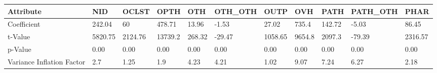 \begin{tabular}{lllllllllll}
\toprule
Attribute &      NID &    OCLST &     OPTH &     OTH & OTH\_OTH &     OUTP &     OVH &    PATH & PATH\_OTH &     PHAR \\
\midrule
Coefficient               &   242.04 &       60 &   478.71 &   13.96 &   -1.53 &    27.02 &   735.4 &  142.72 &    -5.03 &    86.45 \\
t-Value                   &  5820.75 &  2124.76 &  13739.2 &  268.32 &  -29.47 &  1058.65 &  9654.8 &  2097.3 &   -79.39 &  2316.57 \\
p-Value                   &     0.00 &     0.00 &     0.00 &    0.00 &    0.00 &     0.00 &    0.00 &    0.00 &     0.00 &     0.00 \\
Variance Inflation Factor &      2.7 &     1.25 &      1.9 &    4.23 &    4.21 &     1.02 &    9.07 &    7.24 &     6.27 &     2.18 \\
\bottomrule
\end{tabular}
